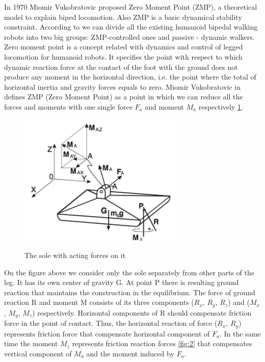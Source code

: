 \documentclass[11pt,a4paper]{report}
\begin{document}
		In 1970 Miomir Vukobratovic proposed Zero Moment Point (ZMP), a theoretical model to explain biped locomotion. Also ZMP is a basic dynamical stability constraint.
		According to \cite{manchester2011stable} we can divide all the existing humanoid bipedal walking robots into two big groups: ZMP-controlled ones and passive - dynamic walkers.\\
		Zero moment point is a concept related with dynamics and control of legged locomotion for humanoid robots. It specifies the point with respect to which dynamic reaction force at the contact of the foot with the ground does not produce any moment in the horizontal direction, i.e. the point where the total of horizontal inertia and gravity forces equals to zero.
		Miomir Vukobratovic in \cite{vukobratovic2004zero} defines ZMP (Zero Moment Point) as a point in which we can reduce all the forces and moments with one single force $F_a$ and moment $M_a$ respectively  \cref{fig:1}.
	
		\begin{figure}[h!]
			\vspace{-0.2cm}
			\centering
			{\includegraphics[width=0.7\textwidth]{1}}
			\caption{The sole with acting forces on it}
			\label{fig:1}
			\vspace{-0.1cm}
		\end{figure}

		On the figure above we consider only the sole separately from other parts of the leg. It has its own center of gravity G. At point P there is resulting ground reaction that maintains the construction in the equilibrium. The force of ground reaction R and moment M consists of its three components ($R_x$, $R_y$, $R_z$) and ($M_x$, $M_y$, $M_z$) respectively. Horizontal components of R should compensate friction force in the point of contact. Thus, the horizontal reaction of force ($R_x$, $R_y$) represents 
		friction force that compensate horizontal component of $F_a$. In the same time the moment $M_z$ represents friction reaction forces \cref{fig:2} that compensates vertical component of $M_a$ and the moment induced by $F_a$. \cite{vukobratovic2004zero}
\end{document}
